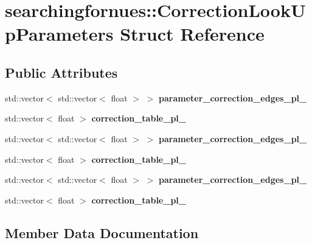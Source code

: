 \hypertarget{structsearchingfornues_1_1CorrectionLookUpParameters}{}\section{searchingfornues\+:\+:Correction\+Look\+Up\+Parameters Struct Reference}
\label{structsearchingfornues_1_1CorrectionLookUpParameters}
\subsection*{Public Attributes}
\begin{DoxyCompactItemize}
\item 
std\+::vector$<$ std\+::vector$<$ float $>$ $>$ {\bfseries parameter\+\_\+correction\+\_\+edges\+\_\+pl\+\_}
\item 
std\+::vector$<$ float $>$ {\bfseries correction\+\_\+table\+\_\+pl\+\_}
\item 
std\+::vector$<$ std\+::vector$<$ float $>$ $>$ {\bfseries parameter\+\_\+correction\+\_\+edges\+\_\+pl\+\_}
\item 
std\+::vector$<$ float $>$ {\bfseries correction\+\_\+table\+\_\+pl\+\_}
\item 
std\+::vector$<$ std\+::vector$<$ float $>$ $>$ {\bfseries parameter\+\_\+correction\+\_\+edges\+\_\+pl\+\_}
\item 
std\+::vector$<$ float $>$ {\bfseries correction\+\_\+table\+\_\+pl\+\_}
\end{DoxyCompactItemize}


\subsection{Member Data Documentation}
